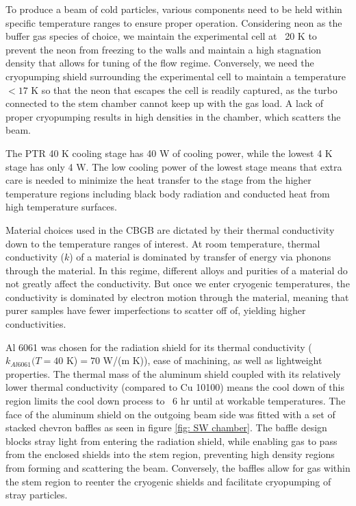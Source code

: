 To produce a beam of cold particles, various components need to be held within specific temperature ranges to ensure proper operation. Considering neon as the buffer gas species of choice, we maintain the experimental cell at ~20 K to prevent the neon from freezing to the walls and maintain a high stagnation density that allows for tuning of the flow regime. Conversely, we need the cryopumping shield surrounding the experimental cell to maintain a temperature $<17$ K so that the neon that escapes the cell is readily captured, as the turbo connected to the stem chamber cannot keep up with the gas load. A lack of proper cryopumping results in high densities in the chamber, which scatters the beam.

The PTR 40 K cooling stage has 40 W of cooling power, while the lowest 4 K stage has only 4 W. The low cooling power of the lowest stage means that extra care is needed to minimize the heat transfer to the stage from the higher temperature regions including black body radiation and conducted heat from high temperature surfaces.

Material choices used in the CBGB are dictated by their thermal conductivity down to the temperature ranges of interest. At room temperature, thermal conductivity ($k$) of a material is dominated by transfer of energy via phonons through the material. In this regime, different alloys and purities of a material do not greatly affect the conductivity. But once we enter cryogenic temperatures, the conductivity is dominated by electron motion through the material, meaning that purer samples have fewer imperfections to scatter off of, yielding higher conductivities.

Al 6061 was chosen for the radiation shield for its thermal conductivity ($k_{Al6061}(T=40$ K)$ = 70$ W/(m K)\cite{NIST}), ease of machining, as well as lightweight properties. The thermal mass of the aluminum shield coupled with its relatively lower thermal conductivity (compared to Cu 10100) means the cool down of this region limits the cool down process to ~6 hr until at workable temperatures. The face of the aluminum shield on the outgoing beam side was fitted with a set of stacked chevron baffles as seen in figure \ref{fig: SW chamber}. The baffle design blocks stray light from entering the radiation shield, while enabling gas to pass from the enclosed shields into the stem region, preventing high density regions from forming and scattering the beam. Conversely, the baffles allow for gas within the stem region to reenter the cryogenic shields and facilitate cryopumping of stray particles.

